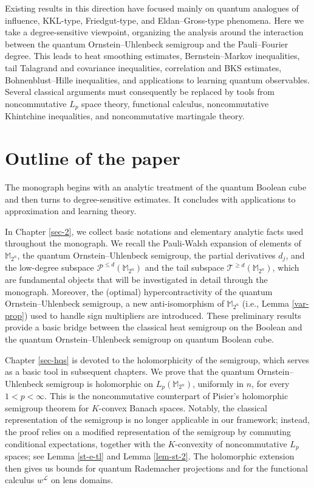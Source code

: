\documentclass{amsbook}
\theoremstyle{definition}
\theoremstyle{remark}
\numberwithin{section}{chapter}
\numberwithin{equation}{chapter}
\newcommand{\1}{\mathbf{1}}
\begin{document}
 Existing results in this direction have focused mainly on quantum analogues of influence, KKL-type, Friedgut-type, and Eldan--Gross-type phenomena. Here we take a degree-sensitive viewpoint, organizing the analysis around the interaction between the quantum Ornstein--Uhlenbeck semigroup and the Pauli--Fourier degree. This leads to heat smoothing estimates, Bernstein--Markov inequalities, tail Talagrand and covariance inequalities, correlation and BKS estimates, Bohnenblust--Hille inequalities, and applications to learning quantum observables. Several classical arguments must consequently be replaced by tools from noncommutative $L_{p}$ space theory, functional calculus, noncommutative Khintchine inequalities, and noncommutative martingale theory.

\newpage
\section{Outline of the paper}\label{roadmap}
 The monograph begins with an analytic treatment of the quantum Boolean cube and then turns to degree-sensitive estimates. It concludes with applications to approximation and learning theory.

In Chapter \ref{sec-2}, we collect basic notations and elementary analytic facts used throughout the monograph.  We recall the Pauli-Walsh expansion of elements of $\mathbb{M}_{2^{n}}$, the quantum Ornstein--Uhlenbeck semigroup, the partial derivatives $d_{j}$, and the low-degree  subspace $\mathcal P^{\leq d}(\mathbb{M}_{2^{n}})$ and the tail subspace $\mathcal{T}^{\geq d}(\mathbb{M}_{2^{n}})$, which are fundamental objects that will be  investigated in detail through the monograph. Moreover, the (optimal) hypercontractivity of the quantum Ornstein--Uhlenbeck semigroup, a new anti-isomorphism of $\mathbb{M}_{2^{n}}$ (i.e., Lemma \ref{var-prop}) used to handle sign multipliers are introduced.  These preliminary results provide a basic bridge between the classical heat semigroup on the Boolean and the quantum Ornstein--Uhlenbeck semigroup on quantum Boolean cube.

Chapter \ref{sec-hqs} is devoted to the holomorphicity of the semigroup, which serves as a basic tool in subsequent chapters. We prove that the quantum Ornstein--Uhlenbeck semigroup is holomorphic on $L_{p}(\mathbb{M}_{2^{n}})$, uniformly in $n$, for every $1<p<\infty$.  This is the noncommutative counterpart of Pisier's holomorphic semigroup theorem for $K$-convex Banach spaces. Notably, the classical  representation of the semigroup is no longer applicable in our framework; instead, the proof relies on a modified  representation of the semigroup by commuting conditional expectations, together with the $K$-convexity of noncommutative $L_{p}$ spaces; see Lemma \ref{st-e-tl} and Lemma \ref{lem-st-2}. The holomorphic extension then gives us bounds for quantum Rademacher projections and for the functional calculus $w^{\mathcal L}$ on lens domains.
\end{document}
